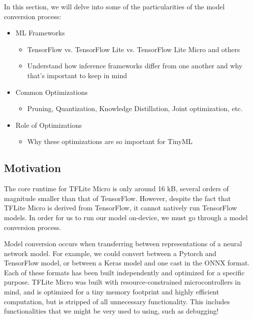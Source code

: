 {{{{{    In this section, we will delve into some of the particularities of the model conversion process:
    
    \begin{itemize}
      \item  ML Frameworks
        \begin{itemize}
          \item TensorFlow vs. TensorFlow Lite vs. TensorFlow Lite Micro and others
          \item Understand how inference frameworks differ from one another and why that’s important to keep in mind
        \end{itemize}
      \item Common Optimizations
        \begin{itemize}
          \item Pruning, Quantization, Knowledge Distillation, Joint optimization, etc.
        \end{itemize}
      \item Role of Optimizations
        \begin{itemize}
          \item Why these optimizations are so important for TinyML
        \end{itemize}
    \end{itemize}
    
    \subsection{Motivation}
    
    
    The core runtime for TFLite Micro is only around 16 kB, several orders of magnitude smaller than that of TensorFlow. However, despite the fact that TFLite Micro is derived from TensorFlow, it cannot natively run TensorFlow models. In order for us to run our model on-device, we must go through a model conversion process.
    
    Model conversion occurs when transferring between representations of a neural network model. For example, we could convert between a Pytorch and TensorFlow model, or between a Keras model and one cast in the ONNX format. Each of these formats has been built independently and optimized for a specific purpose. TFLite Micro was built with resource-constrained microcontrollers in mind, and is optimized for a tiny memory footprint and highly efficient computation, but is stripped of all unnecessary functionality. This includes functionalities that we might be very used to using, such as debugging!
    
}}}}}
